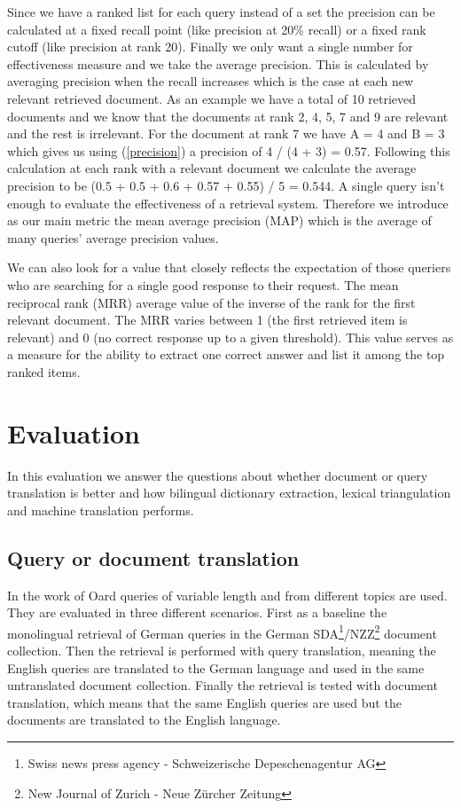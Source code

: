 \documentclass[journal]{IEEEtran}
\begin{document}
Since we have a ranked list for each query instead of a set the precision can be calculated at a fixed recall point (like precision at 20\% recall) or a fixed rank cutoff (like precision at rank 20).
Finally we only want a single number for effectiveness measure and we take the average precision.
This is calculated by averaging precision when the recall increases which is the case at each new relevant retrieved document.
As an example we have a total of 10 retrieved documents and we know that the documents at rank 2, 4, 5, 7 and 9 are relevant and the rest is irrelevant.
For the document at rank 7 we have A = 4 and B = 3 which gives us using (\ref{precision}) a precision of 4 / (4 + 3) = 0.57.
Following this calculation at each rank with a relevant document we calculate the average precision to be (0.5 + 0.5 + 0.6 + 0.57 + 0.55) / 5 = 0.544.
A single query isn't enough to evaluate the effectiveness of a retrieval system.
Therefore we introduce as our main metric the mean average precision (MAP) which is the average of many queries' average precision values.

We can also look for a value that closely reflects the expectation of those queriers who are searching for a single good response to their request.
The mean reciprocal rank (MRR) average value of the inverse of the rank for the first relevant document.
The MRR varies between 1 (the first retrieved item is relevant) and 0 (no correct response up to a given threshold).
This value serves as a measure for the ability to extract one correct answer and list it among the top ranked items.


\section{Evaluation}
In this evaluation we answer the questions about whether document or query translation is better and how bilingual dictionary extraction, lexical triangulation and machine translation performs.

\subsection{Query or document translation}
In the work of Oard \cite{oard97b} queries of variable length and from different topics are used.
They are evaluated in three different scenarios.
First as a baseline the monolingual retrieval of German queries in the German SDA\footnote{Swiss news press agency - Schweizerische Depeschenagentur AG}/NZZ\footnote{New Journal of Zurich - Neue Z\"{u}rcher Zeitung} document collection.
Then the retrieval is performed with query translation, meaning the English queries are translated to the German language and used in the same untranslated document collection.
Finally the retrieval is tested with document translation, which means that the same English queries are used but the documents are translated to the English language.
\end{document}
